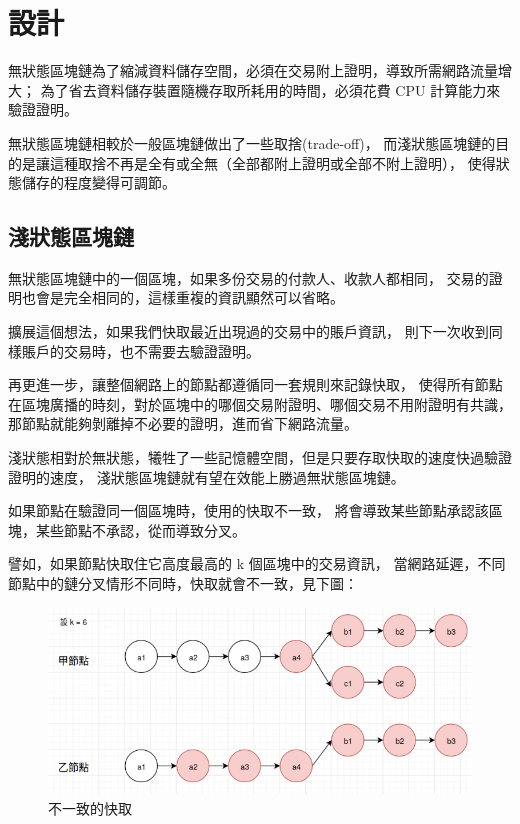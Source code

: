 \graphicspath{ {./images/} }
\chapter{設計}
\label{c:design}

無狀態區塊鏈為了縮減資料儲存空間，必須在交易附上證明，導致所需網路流量增大；
為了省去資料儲存裝置隨機存取所耗用的時間，必須花費 CPU 計算能力來驗證證明。

無狀態區塊鏈相較於一般區塊鏈做出了一些取捨(trade-off)，
而淺狀態區塊鏈的目的是讓這種取捨不再是全有或全無（全部都附上證明或全部不附上證明），
使得狀態儲存的程度變得可調節。

\section{淺狀態區塊鏈}

無狀態區塊鏈中的一個區塊，如果多份交易的付款人、收款人都相同，
交易的證明也會是完全相同的，這樣重複的資訊顯然可以省略。

擴展這個想法，如果我們快取最近出現過的交易中的賬戶資訊，
則下一次收到同樣賬戶的交易時，也不需要去驗證證明。

再更進一步，讓整個網路上的節點都遵循同一套規則來記錄快取，
使得所有節點在區塊廣播的時刻，對於區塊中的哪個交易附證明、哪個交易不用附證明有共識，
那節點就能夠剝離掉不必要的證明，進而省下網路流量。

淺狀態相對於無狀態，犧牲了一些記憶體空間，但是只要存取快取的速度快過驗證證明的速度，
淺狀態區塊鏈就有望在效能上勝過無狀態區塊鏈。


如果節點在驗證同一個區塊時，使用的快取不一致，
將會導致某些節點承認該區塊，某些節點不承認，從而導致分叉。

譬如，如果節點快取住它高度最高的 k 個區塊中的交易資訊，
當網路延遲，不同節點中的鏈分叉情形不同時，快取就會不一致，見下圖：

\begin{figure}[h]
\includegraphics[width=\textwidth]{wrong-cache}
\caption{不一致的快取}
\end{figure}

